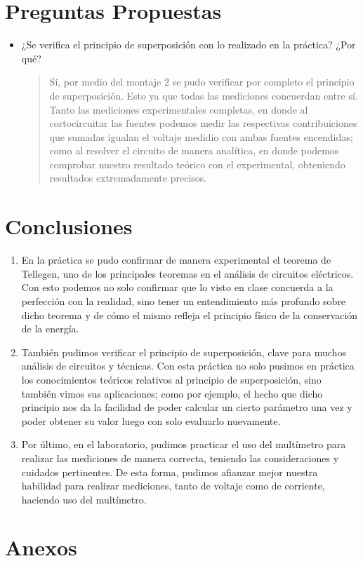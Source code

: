 \documentclass{article}
\begin{document}
    \section{Preguntas Propuestas}

    \begin{itemize}
        \item ¿Se verifica el principio de superposición con lo realizado en la práctica? ¿Por qué?
        
        \begin{quote}
            Sí, por medio del montaje 2 se pudo verificar por completo el principio de superposición. Esto ya que todas las mediciones concuerdan entre sí. Tanto las mediciones experimentales completas, en donde al cortocircuitar las fuentes podemos medir las respectivas contribuiciones que sumadas igualan el voltaje medidio con ambas fuentes encendidas; como al resolver el circuito de manera analítica, en donde podemos comprobar nuestro resultado teórico con el experimental, obteniendo resultados extremadamente precisos.
        \end{quote}
    \end{itemize}

    \section{Conclusiones}

    \begin{enumerate}
        \item En la práctica se pudo confirmar de manera experimental el teorema de Tellegen, uno de los principales teoremas en el análisis de circuitos eléctricos. Con esto podemos no solo confirmar que lo visto en clase concuerda a la perfección con la realidad, sino tener un entendimiento más profundo sobre dicho teorema y de cómo el mismo refleja el principio físico de la conservación de la energía.
        \item También pudimos verificar el principio de superposición, clave para muchos análisis de circuitos y técnicas. Con esta práctica no solo pusimos en práctica los conocimientos teóricos relativos al principio de superposición, sino también vimos sus aplicaciones; como por ejemplo, el hecho que dicho principio nos da la facilidad de poder calcular un cierto parámetro una vez y poder obtener su valor luego con solo evaluarlo nuevamente.
        \item Por último, en el laboratorio, pudimos practicar el uso del multímetro para realizar las mediciones de manera correcta, teniendo las consideraciones y cuidados pertinentes. De esta forma, pudimos afianzar mejor nuestra habilidad para realizar mediciones, tanto de voltaje como de corriente, haciendo uso del multímetro.
    \end{enumerate}
    
    \nocite{*}
    \printbibliography{}

    \section{Anexos}


\end{document}

